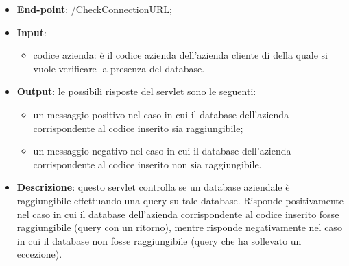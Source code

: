 \begin{itemize}
	\item \textbf{End-point}: /CheckConnectionURL;
	\item \textbf{Input}:
		\begin{itemize}
			\item codice azienda: è il codice azienda dell'azienda cliente di \visione{} della quale si vuole verificare la presenza del database.
		\end{itemize}
	\item \textbf{Output}: le possibili risposte del servlet sono le seguenti:
		\begin{itemize}
			\item un messaggio positivo nel caso in cui il database dell'azienda corrispondente al codice inserito sia raggiungibile;
			\item un messaggio negativo nel caso in cui il database dell'azienda corrispondente al codice inserito non sia raggiungibile.
		\end{itemize}
	\item \textbf{Descrizione}: questo servlet controlla se un database aziendale è raggiungibile effettuando una query su tale database. Risponde positivamente nel caso in cui il database dell'azienda corrispondente al codice inserito fosse raggiungibile (query con un ritorno), mentre risponde negativamente nel caso in cui il database non fosse raggiungibile (query che ha sollevato un eccezione).
\end{itemize}


